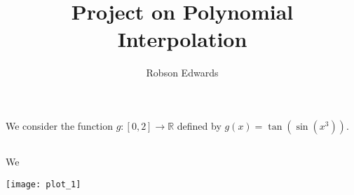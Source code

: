 \documentclass[11pt, oneside]{article}
\title{Project on Polynomial Interpolation}
\author{Robson Edwards}
\begin{document}
\maketitle

\section{}

We consider the function $g: [0, 2] \rightarrow \mathbb{R}$ defined by
$g(x) = \tan(\sin(x^3))$.
\subsection{}

We 

\texttt{[image: plot\_1]}

\subsection{}

\subsection{}

\section{}

\subsection{}

\subsection{}

\subsection{}
\end{document}
